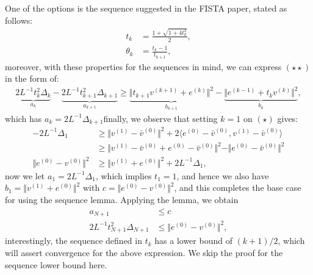 \documentclass[]{article}
\theoremstyle{definition}
\begin{document}
        One of the options is the sequence suggested in the FISTA paper, stated as follows: 
        \begin{align*}
            t_k &= \frac{1 + \sqrt{1 + 4t_k^2}}{2}, 
            \\
            \theta_k &= \frac{t_k - 1}{t_{k + 1}}, 
            \tag{$\star \star *$}
        \end{align*}
        moreover, with these properties for the sequences in mind, we can express $(\star\star)$ in the form of:
        \begin{align*}
            \underbrace{2L^{-1}t_k^2\Delta_k}_{a_k} - \underbrace{2L^{-1}t_{k + 1}^2\Delta_{k + 1}}_{a_{k + 1}}
            \ge 
            \underbrace{\Vert t_{k + 1}v^{(k + 1)} + e^{(k)}\Vert^2}_{b_{k + 1}}
            - 
            \underbrace{\Vert e^{(k - 1)} + t_k  v^{(k)} \Vert^2}_{b_{k}}, 
        \end{align*}
        which has $a_k = 2L^{-1}\Delta_{k + 1}$finally, we observe that setting $k = 1$ on $(\star)$ gives: 
        \begin{align*}
            -2L^{-1}  \Delta_1
            & \ge 
            \Vert v^{(1)} - \bar v^{(0)}\Vert^2 + 
            2\langle e^{(0)} - \bar v^{(0)}, v^{(1)} - \bar v^{(0)}\rangle
            \\
            &\ge
            \Vert 
                v^{(1)} - \bar v^{(0)}
                + 
                e^{(0)} - \bar v^{(0)}
            \Vert^2
            - 
            \Vert 
                e^{(0)} - \bar v^{(0)}
            \Vert^2
            \\
            \Vert e^{(0)} - v^{(0)}\Vert^2
            & \ge 
            \Vert v^{(1)} + e^{(0)}\Vert^2 + 2L^{-1}\Delta_1, 
        \end{align*}
        now we let $a_1 = 2L^{-1}\Delta_1$, which implies $t_1 = 1$, and hence we also have $b_1 = \Vert v^{(1)} + e^{(0)}\Vert^2$ with $c = \Vert e^{(0)} - v^{(0)}\Vert^2$, and this completes the base case for using the sequence lemma. Applying the lemma, we obtain 
        \begin{align*}
            a_{N + 1} &\le c
            \\
            2L^{-1}t_{N + 1}^2\Delta_{N + 1} &\le \Vert e^{(0)} - v^{(0)}\Vert^2, 
        \end{align*}
        interestingly, the sequence defined in $t_k$ has a lower bound of $(k + 1)/2$, which will assert convergence for the above expression. We skip the proof for the sequence lower bound here. 



\end{document}

